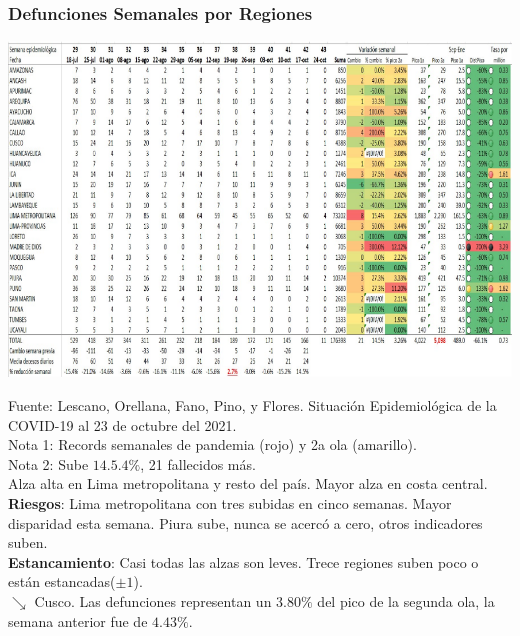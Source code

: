 \documentclass[xcolor=table]{beamer}
\begin{document}
\begin{frame}
	\frametitle{Defunciones Semanales por Regiones}
\vspace{-.5cm}
\begin{center}
	\includegraphics[width=0.6\linewidth]{../sala_nacional/defunciones_regional.png}
\end{center}
{\tiny Fuente: Lescano, Orellana, Fano, Pino, y Flores. Situación Epidemiológica de la COVID-19 al 23 de octubre del 2021.\\
	Nota 1: Records semanales de pandemia (rojo) y 2a ola (amarillo). \\
Nota 2: Sube $ 14.5.4\% $, 21 fallecidos más. \\
Alza alta en Lima metropolitana  y resto del país. 
Mayor alza en costa central. \\
\textbf{Riesgos}: Lima metropolitana con tres subidas en cinco semanas. Mayor disparidad esta semana. Piura sube, nunca se acercó a cero, otros indicadores suben. \\
\textbf{Estancamiento}: Casi todas las alzas son leves. Trece regiones suben poco o están estancadas($\pm 1$).\\} 
\vspace{0.01cm}
$\searrow$ {\color{mycolor5}Cusco}. Las defunciones representan un $3.80\% $ del pico de la segunda ola, la semana anterior fue de $4.43\%$. \\
\end{frame}
	
\end{document}
